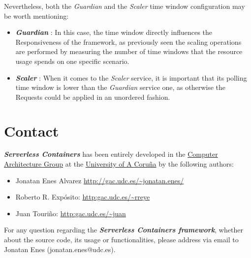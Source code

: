 \documentclass[12pt]{article}
\begin{document}
Nevertheless, both the \textit{Guardian} and the \textit{Scaler} time window configuration may be worth mentioning:
\begin{itemize}
	\item \textbf{\textit{Guardian}} : In this case, the time window directly influences the Responsiveness of the framework, as previously seen the scaling operations are performed by measuring the number of time windows that the resource usage spends on one specific scenario.
	\item \textbf{\textit{Scaler}} : When it comes to the \textit{Scaler} service, it is important that its polling time window is lower than the \textit{Guardian} service one, as otherwise the Requests could be applied in an unordered fashion.
\end{itemize}

\section{Contact}

\textit{\textbf{Serverless Containers}} has been entirely developed in the \href{http://gac.udc.es/english/}{Computer Architecture Group} at the \href{https://www.udc.es/index.html?language=en}{University of A Coru\~na} by the following authors:

\begin{itemize}
	\item Jonatan Enes Alvarez \url{http://gac.udc.es/~jonatan.enes/}
	\item Roberto R. Exp\'osito: \url{http:gac.udc.es/~rreye}
	\item Juan Touri\~no: \url{http:gac.udc.es/~juan}
\end{itemize}

For any question regarding the \textit{\textbf{Serverless Containers framework}}, whether about the source code, its usage or functionalities, please address via email to Jonatan Enes (jonatan.enes@udc.es).



\end{document}
